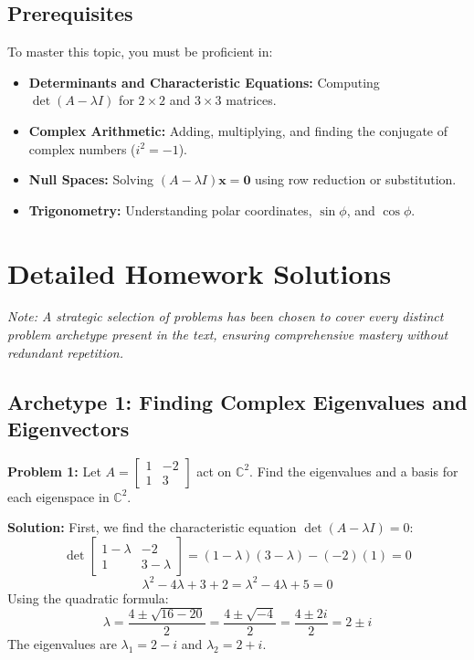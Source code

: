 \documentclass[11pt, letterpaper]{article}
\theoremstyle{definition}
\theoremstyle{remark}
\begin{document}
\subsection{Prerequisites}
To master this topic, you must be proficient in:
\begin{itemize}
    \item \textbf{Determinants and Characteristic Equations:} Computing $\det(A - \lambda I)$ for $2 \times 2$ and $3 \times 3$ matrices.
    \item \textbf{Complex Arithmetic:} Adding, multiplying, and finding the conjugate of complex numbers ($i^2 = -1$).
    \item \textbf{Null Spaces:} Solving $(A - \lambda I)\mathbf{x} = \mathbf{0}$ using row reduction or substitution.
    \item \textbf{Trigonometry:} Understanding polar coordinates, $\sin\phi$, and $\cos\phi$.
\end{itemize}

\newpage

\section{Detailed Homework Solutions}
\textit{Note: A strategic selection of problems has been chosen to cover every distinct problem archetype present in the text, ensuring comprehensive mastery without redundant repetition.}

\subsection{Archetype 1: Finding Complex Eigenvalues and Eigenvectors}

\textbf{Problem 1:} Let $A = \begin{bmatrix} 1 & -2 \\ 1 & 3 \end{bmatrix}$ act on $\mathbb{C}^2$. Find the eigenvalues and a basis for each eigenspace in $\mathbb{C}^2$.

\textbf{Solution:}
First, we find the characteristic equation $\det(A - \lambda I) = 0$:
\[
\det \begin{bmatrix} 1 - \lambda & -2 \\ 1 & 3 - \lambda \end{bmatrix} = (1 - \lambda)(3 - \lambda) - (-2)(1) = 0
\]
\[
\lambda^2 - 4\lambda + 3 + 2 = \lambda^2 - 4\lambda + 5 = 0
\]
Using the quadratic formula:
\[
\lambda = \frac{4 \pm \sqrt{16 - 20}}{2} = \frac{4 \pm \sqrt{-4}}{2} = \frac{4 \pm 2i}{2} = 2 \pm i
\]
The eigenvalues are $\lambda_1 = 2 - i$ and $\lambda_2 = 2 + i$.
\end{document}
